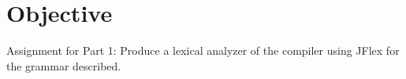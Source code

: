 \setcounter{secnumdepth}{2}

\chapter{Objective}

Assignment for Part 1: Produce a lexical analyzer of the compiler using JFlex for the grammar described.\\